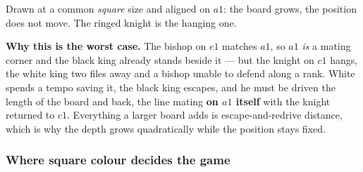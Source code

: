 \documentclass[10pt]{article}
\begin{document}
\medskip
\noindent
{}\hfill
{}\hfill
{}

\medskip
\noindent
{\small Drawn at a common \emph{square} size and aligned on $a1$: the board
grows, the position does not move. The ringed knight is the hanging one.}

\medskip
\noindent
\textbf{Why this is the worst case.} The bishop on $e1$ matches $a1$, so $a1$
\emph{is} a mating corner and the black king already stands beside it --- but
the knight on $c1$ hangs, the white king two files away and a bishop unable to
defend along a rank. White spends a tempo saving it, the black king escapes,
and he must be driven the length of the board and back, the line mating
\textbf{on $a1$ itself} with the knight returned to $c1$. Everything a larger
board adds is escape-and-redrive distance, which is why the depth grows
quadratically while the position stays fixed.

\subsubsection{Where square colour decides the game}\label{sub:kbnk-colour}
\end{document}
